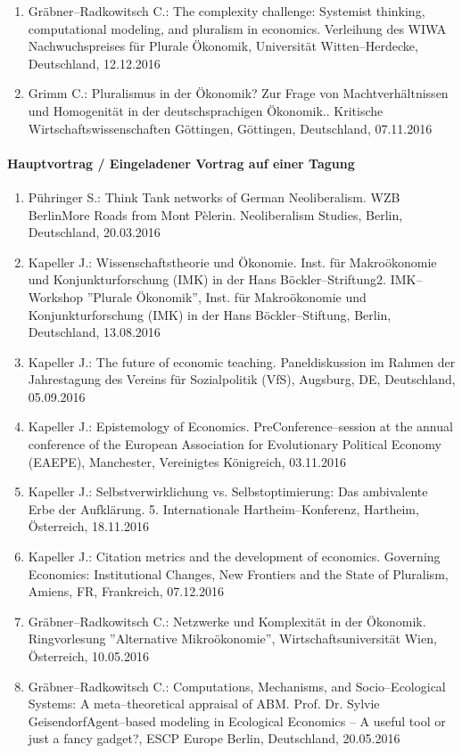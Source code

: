\begin{enumerate}
	\item Gräbner--Radkowitsch C.: The complexity challenge: Systemist thinking, computational modeling, and pluralism in economics. Verleihung des WIWA Nachwuchspreises für Plurale Ökonomik, Universität Witten--Herdecke, Deutschland, 12.12.2016
	\item Grimm C.: Pluralismus in der Ökonomik? Zur Frage von Machtverhältnissen und Homogenität in der deutschsprachigen Ökonomik.. Kritische Wirtschaftswissenschaften Göttingen, Göttingen, Deutschland, 07.11.2016
\end{enumerate}
\paragraph{Hauptvortrag / Eingeladener Vortrag auf einer Tagung}
\begin{enumerate}
	\item Pühringer S.: Think Tank networks of German Neoliberalism. WZB BerlinMore Roads from Mont Pèlerin. Neoliberalism Studies, Berlin, Deutschland, 20.03.2016
	\item Kapeller J.: Wissenschaftstheorie und Ökonomie. Inst. für Makroökonomie und  Konjunkturforschung (IMK) in der Hans Böckler--Striftung2. IMK--Workshop ''Plurale Ökonomik'', Inst. für Makroökonomie und Konjunkturforschung (IMK) in der Hans Böckler--Stiftung, Berlin, Deutschland, 13.08.2016
	\item Kapeller J.: The future of economic teaching. Paneldiskussion im Rahmen der Jahrestagung des Vereins für Sozialpolitik (VfS), Augsburg, DE, Deutschland, 05.09.2016
	\item Kapeller J.: Epistemology of Economics. PreConference--session at the annual conference of the European Association for Evolutionary Political Economy (EAEPE), Manchester, Vereinigtes Königreich, 03.11.2016
	\item Kapeller J.: Selbstverwirklichung vs. Selbstoptimierung: Das ambivalente Erbe der Aufklärung. 5. Internationale Hartheim--Konferenz, Hartheim, Österreich, 18.11.2016
	\item Kapeller J.: Citation metrics and the development of economics. Governing Economics: Institutional Changes, New Frontiers and the State of Pluralism, Amiens, FR, Frankreich, 07.12.2016
	\item Gräbner--Radkowitsch C.: Netzwerke und Komplexität in der Ökonomik. Ringvorlesung ''Alternative Mikroökonomie'', Wirtschaftsuniversität Wien, Österreich, 10.05.2016
	\item Gräbner--Radkowitsch C.: Computations, Mechanisms, and Socio--Ecological Systems: A meta--theoretical appraisal of ABM. Prof. Dr. Sylvie GeisendorfAgent--based modeling in Ecological Economics -- A useful tool or just a fancy gadget?, ESCP Europe Berlin, Deutschland, 20.05.2016
\end{enumerate}
